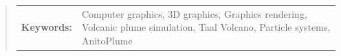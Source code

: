 \begin{abstract}
%
%


\begin{flushleft}
\begin{tabular}{lp{4.25in}}
\hspace{-0.5em}\textbf{Keywords:}\hspace{0.25em} & Computer graphics, 3D graphics, Graphics rendering, Volcanic plume simulation, Taal Volcano, Particle systems, AnitoPlume 
\end{tabular}
\end{flushleft}
\end{abstract}
